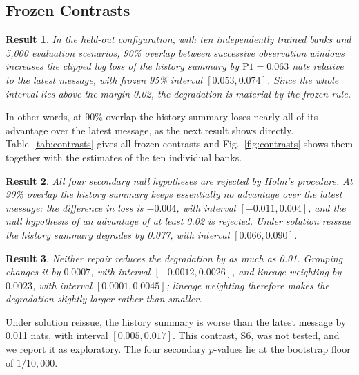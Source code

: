 \documentclass[conference]{IEEEtran}
\newtheorem{result}{Result}
\newcommand{\Pone}{\mathrm{P1}}
\begin{document}
\subsection{Frozen Contrasts}

\begin{result}\label{res:primary}
In the held-out configuration, with ten independently trained banks and 5,000 evaluation scenarios, 90\% overlap between successive observation windows increases the clipped log loss of the history summary by $\Pone=0.063$ nats relative to the latest message, with frozen 95\% interval $[0.053,0.074]$. Since the whole interval lies above the margin 0.02, the degradation is material by the frozen rule.
\end{result}

In other words, at 90\% overlap the history summary loses nearly all of its advantage over the latest message, as the next result shows directly. Table~\ref{tab:contrasts} gives all frozen contrasts and Fig.~\ref{fig:contrasts} shows them together with the estimates of the ten individual banks.

\begin{result}\label{res:secondary}
All four secondary null hypotheses are rejected by Holm's procedure. At 90\% overlap the history summary keeps essentially no advantage over the latest message: the difference in loss is $-0.004$, with interval $[-0.011,0.004]$, and the null hypothesis of an advantage of at least 0.02 is rejected. Under solution reissue the history summary degrades by 0.077, with interval $[0.066,0.090]$.
\end{result}

\begin{result}\label{res:repairs}
Neither repair reduces the degradation by as much as 0.01. Grouping changes it by $0.0007$, with interval $[-0.0012,0.0026]$, and lineage weighting by $0.0023$, with interval $[0.0001,0.0045]$; lineage weighting therefore makes the degradation slightly larger rather than smaller.
\end{result}

Under solution reissue, the history summary is worse than the latest message by 0.011 nats, with interval $[0.005,0.017]$. This contrast, S6, was not tested, and we report it as exploratory. The four secondary $p$-values lie at the bootstrap floor of $1/10{,}000$.
\end{document}
